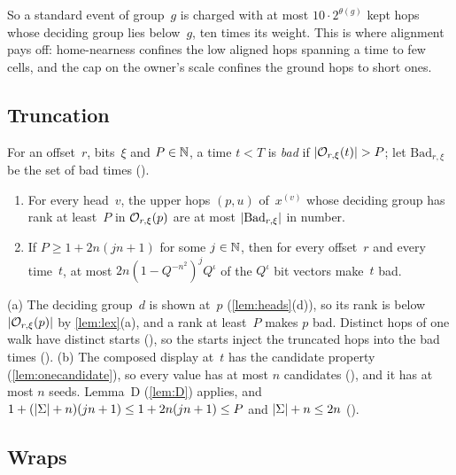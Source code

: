 So a standard event of group~$g$ is charged with at most $10\cdot2^{\theta(g)}$ kept hops whose deciding group lies below~$g$, ten
times its weight. This is where alignment pays off: home-nearness confines the low aligned hops spanning a time to few cells, and the
cap on the owner's scale confines the ground hops to short ones.

\subsection{Truncation}\label{sec:acc-trunc}

For an offset~$r$, bits~$\xi$ and $P\in\mathbb{N}$, a time $t<T$ is \emph{bad} if $\lvert \mathcal{O}_{r,\xi}(t) \rvert>P$; let $\mathrm{Bad}_{r,\xi}$ be the
set of bad times ().

\begin{lemma}[Truncation]\label{lem:trunc}
\begin{enumerate}[label=(\alph*)]
\item For every head~$v$, the upper hops $(p,u)$ of~$x^{(v)}$ whose deciding group has rank at least~$P$ in $\mathcal{O}_{r,\xi}(p)$ are at
most $\lvert \mathrm{Bad}_{r,\xi} \rvert$ in number.
\item If $P\ge1+2n(jn+1)$ for some $j\in\mathbb{N}$, then for every offset~$r$ and every time~$t$, at most $2n(1-Q^{-n^2})^jQ^\iota$ of the
$Q^\iota$ bit vectors make~$t$ bad.
\end{enumerate}
\end{lemma}

\begin{outline}
(a) The deciding group~$d$ is shown at~$p$ (\cref{lem:heads}(d)), so its rank is below $\lvert \mathcal{O}_{r,\xi}(p) \rvert$ by
\cref{lem:lex}(a), and a rank at least~$P$ makes $p$ bad. Distinct hops of one walk have distinct starts
(), so the starts inject the truncated hops into the bad times ().
(b) The composed display at~$t$ has the candidate property (\cref{lem:onecandidate}), so every value has at most $n$ candidates
(), and it has at most $n$ seeds. Lemma~D (\cref{lem:D}) applies, and $1+(\lvert \Sigma \rvert+n)(jn+1)\le1+2n(jn+1)\le
P$ and $\lvert \Sigma \rvert+n\le2n$ ().
\end{outline}

\subsection{Wraps}\label{sec:acc-wraps}

